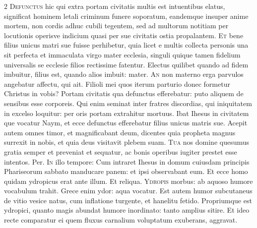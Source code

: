 \begin{multicols*}{2}
 \grecross
\lettrine[lines=2]{\zallmancaps \color{Blue} D}{efunctus} hic qui extra portam civitatis multis est intuentibus elatus, significat hominem letali criminum funere soporatum, eandemque insuper anime mortem, non cordis adhuc cubili tegentem, sed ad multorum notitiam per locutionis operisve indicium quasi per sue civitatis ostia propalantem.
\lettrine[lines=2]{\zallmancaps \color{Red} E}{t} bene filius unicus matri sue fuisse perhibetur, quia licet e multis collecta personis una sit perfecta et immaculata virgo mater ecclesia, singuli quique tamen fidelium universalis se ecclesie filios rectissime fatentur. Electus quilibet quando ad fidem imbuitur, filius est, quando alios imbuit: mater.
\lettrine[lines=2]{\zallmancaps \color{Blue} A}{n} non materno erga parvulos angebatur affectu, qui ait. Filioli mei quos iterum parturio donec formetur Christus in vobis? Portam civitatis qua defunctus efferebatur: puto aliquem de sensibus esse corporeis. Qui enim seminat inter fratres discordias, qui iniquitatem in excelso loquitur: per oris portam extrahitur mortuus.
 Ibat Ihesus in civitatem que vocatur Naym, et ecce defunctus efferebatur filius unicus matris sue.
 Acepit autem omnes timor, et magnificabant deum, dicentes quia propheta magnus surrexit in nobis, et quia deus visitavit plebem suam.%
\lettrine[lines=2]{\zallmancaps \color{Red} T}{ua} nos domine quesumus gratia semper et preveniat et sequatur, ac bonis operibus iugiter prestet esse intentos. Per.
\lettrine[lines=2]{\zallmancaps \color{Blue} I}{n} illo tempore: Cum intraret Ihesus in domum cuiusdam principis Phariseorum sabbato manducare panem: et ipsi observabant eum. Et ecce homo quidam ydropicus erat ante illum. Et reliqua.
\lettrine[lines=2]{\zallmancaps \color{Red} Y}{dropis} morbus: ab aquoso humore vocabulum trahit. Grece enim ydor: aqua vocatur. Est autem humor subcutaneus de vitio vesice natus, cum inflatione turgente, et hanelitu fetido. Propriumque est ydropici, quanto magis abundat humore inordinato: tanto amplius sitire. Et ideo recte comparatur ei quem fluxus carnalium voluptatum exuberans, aggravat.

\end{multicols*}

